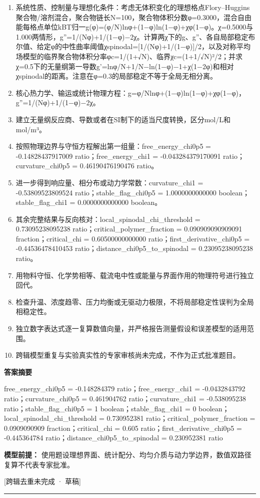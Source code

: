\documentclass[UTF8,11pt,a4paper]{ctexart}
\begin{document}
\begin{enumerate}
\item 系统性质、控制量与理想化条件：考虑无体积变化的理想格点Flory–Huggins聚合物/溶剂混合，聚合物链长N=100，聚合物体积分数φ=0.3000，混合自由能每格点单位kBT归一g(φ)=(φ/N)lnφ+(1−φ)ln(1−φ)+χφ(1−φ)。χ=0.5000与1.000两情形，g''=1/(Nφ)+1/(1−φ)−2χ。计算两χ下的g、g''、各自局部稳定布尔值、给定φ的中性曲率阈值χspinodal=[1/(Nφ)+1/(1−φ)]/2，以及对称平均场模型的临界聚合物体积分率φc=1/(1+√N)、临界χc=(1+1/√N)²/2；并求χ=0.5下的无量纲第一导数g'=lnφ/N+1/N−ln(1−φ)−1+χ(1−2φ)和相对χspinodal的距离。注意在φ=0.3的局部稳定不等于全局无相分离。
\item 核心热力学、输运或统计物理方程：g=φ/Nlnφ+(1−φ)ln(1−φ)+χφ(1−φ)，g''=1/(Nφ)+1/(1−φ)−2χ。
\item 建立无量纲反应商、导数或者在SI制下的适当尺度转换，区分mol/L和mol/m³。
\item 按照物理边界与守恒方程解出第一组量：free\_energy\_chi0p5 = -0.14828437917009 ratio；free\_energy\_chi1 = -0.043284379170091 ratio；curvature\_chi0p5 = 0.46190476190476 ratio。
\item 进一步得到响应量、相分布或动力学常数：curvature\_chi1 = -0.53809523809524 ratio；stable\_flag\_chi0p5 = 1.0000000000000 boolean；stable\_flag\_chi1 = 0.0000000000000 boolean。
\item 其余完整结果与反向核对：local\_spinodal\_chi\_threshold = 0.73095238095238 ratio；critical\_polymer\_fraction = 0.090909090909091 fraction；critical\_chi = 0.60500000000000 ratio；first\_derivative\_chi0p5 = -0.44536478410453 ratio；distance\_chi0p5\_to\_spinodal = 0.23095238095238 ratio。
\item 用物料守恒、化学势相等、载流电中性或能量与界面作用的物理符号进行独立回代。
\item 检查升温、浓度趋零、压力均衡或无驱动力极限，不将局部稳定性误判为全局相稳定性。
\item 独立数字表达式逐一复算数值向量，并严格报告测量假设和误差模型的适用范围。
\item 跨辑模型重复与实验真实性的专家审核尚未完成，不作为正式批准题目。
\end{enumerate}
\noindent\textbf{答案摘要}\par
free\_energy\_chi0p5 = -0.148284379 ratio；free\_energy\_chi1 = -0.0432843792 ratio；curvature\_chi0p5 = 0.461904762 ratio；curvature\_chi1 = -0.538095238 ratio；stable\_flag\_chi0p5 = 1 boolean；stable\_flag\_chi1 = 0 boolean；local\_spinodal\_chi\_threshold = 0.730952381 ratio；critical\_polymer\_fraction = 0.0909090909 fraction；critical\_chi = 0.605 ratio；first\_derivative\_chi0p5 = -0.445364784 ratio；distance\_chi0p5\_to\_spinodal = 0.230952381 ratio\par
\noindent\textbf{模型前提：}
使用题设理想界面、统计配分、均匀介质与动力学边界，数值双路径复算不代表专家批准。\par
\noindent\textcolor{red!65!black}{[跨辑去重未完成 · 草稿]} \par
\medskip\hrule\medskip
{}
\end{document}
